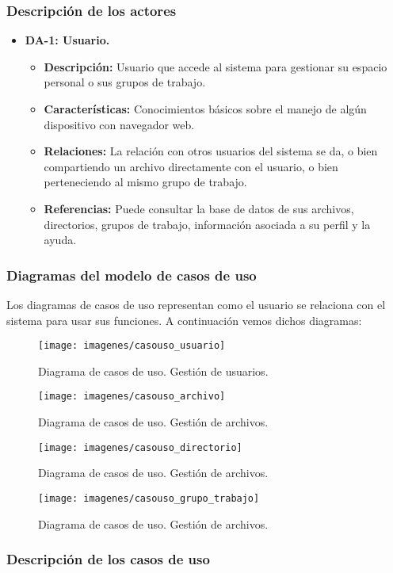 \subsubsection{Descripción de los actores}
\begin{itemize}
	\item \textbf{DA-1: Usuario.}
	\begin{itemize}
		\item \textbf{Descripción:} Usuario que accede al sistema para gestionar su espacio personal o sus grupos de trabajo.
		\item \textbf{Características:} Conocimientos básicos sobre el manejo de algún dispositivo con navegador web.
		\item \textbf{Relaciones:} La relación con otros usuarios del sistema se da, o bien compartiendo un archivo directamente con el usuario, o bien perteneciendo al mismo grupo de trabajo.
		\item \textbf{Referencias:} Puede consultar la base de datos de sus archivos, directorios, grupos de trabajo, información asociada a su perfil y la ayuda.
	\end{itemize}
\end{itemize}
\subsubsection{Diagramas del modelo de casos de uso}
Los diagramas de casos de uso representan como el usuario se relaciona con el sistema para usar sus funciones. A continuación vemos dichos diagramas:

\begin{figure}[H]
	\centering
	\texttt{[image: imagenes/casouso\_usuario]}
	\caption{Diagrama de casos de uso. Gestión de usuarios.}
	\label{fig:casouso_usuario}
\end{figure}

\begin{figure}[H]
	\centering
	\texttt{[image: imagenes/casouso\_archivo]}
	\caption{Diagrama de casos de uso. Gestión de archivos.}
	\label{fig:casouso_archivo}
\end{figure}

\begin{figure}[H]
	\centering
	\texttt{[image: imagenes/casouso\_directorio]}
	\caption{Diagrama de casos de uso. Gestión de archivos.}
	\label{fig:casouso_directorio}
\end{figure}

\begin{figure}[H]
	\centering
	\texttt{[image: imagenes/casouso\_grupo\_trabajo]}
	\caption{Diagrama de casos de uso. Gestión de archivos.}
	\label{fig:casouso_grupo_trabajo}
\end{figure}

\subsubsection{Descripción de los casos de uso}


\newpage

